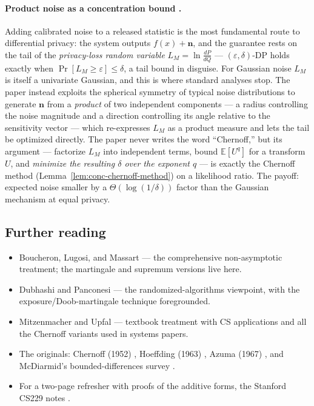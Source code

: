 \label{sec:conc-product}
\paragraph{Product noise as a concentration bound \cite{sigmod26-196}.}
Adding calibrated noise to a released statistic is the most fundamental route to
differential privacy: the system outputs $f(x) + \mathbf{n}$, and the guarantee rests
on the tail of the \emph{privacy-loss random variable} $L_M = \ln\frac{dP}{dQ}$ ---
$(\varepsilon,\delta)$-DP holds exactly when $\Pr[L_M \ge \varepsilon] \le \delta$,
a tail bound in disguise. For Gaussian noise $L_M$ is itself a univariate Gaussian,
and this is where standard analyses stop. The paper instead exploits the spherical
symmetry of typical noise distributions to generate $\mathbf{n}$ from a
\emph{product} of two independent components --- a radius controlling the noise
magnitude and a direction controlling its angle relative to the sensitivity vector
--- which re-expresses $L_M$ as a product measure and lets the tail be optimized
directly. The paper never writes the word ``Chernoff,'' but its argument --- factorize
$L_M$ into independent terms, bound $\mathbb{E}[U^q]$ for a transform $U$, and
\emph{minimize the resulting $\delta$ over the exponent $q$} --- is exactly the
Chernoff method (Lemma~\ref{lem:conc-chernoff-method}) on a likelihood ratio. The
payoff: expected noise smaller by a $\Theta(\log(1/\delta))$ factor than the Gaussian
mechanism at equal privacy.

\subsection{Further reading}

\begin{itemize}
\item Boucheron, Lugosi, and Massart \cite{concentration-ineq-bg5} --- the comprehensive
non-asymptotic treatment; the martingale and supremum versions live here.
\item Dubhashi and Panconesi \cite{concentration-ineq-bg6} --- the
randomized-algorithms viewpoint, with the exposure/Doob-martingale technique foregrounded.
\item Mitzenmacher and Upfal \cite{concentration-ineq-bg8} --- textbook treatment with
CS applications and all the Chernoff variants used in systems papers.
\item The originals: Chernoff (1952) \cite{concentration-ineq-bg1}, Hoeffding (1963)
\cite{concentration-ineq-bg2}, Azuma (1967) \cite{concentration-ineq-bg3}, and
McDiarmid's bounded-differences survey \cite{concentration-ineq-bg4}.
\item For a two-page refresher with proofs of the additive forms, the Stanford CS229
notes \cite{concentration-ineq-bg7}.
\end{itemize}

